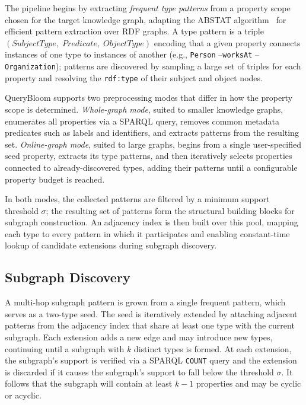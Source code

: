 The pipeline begins by extracting \textit{frequent type patterns} from a
property scope chosen for the target knowledge graph, adapting the ABSTAT
algorithm~\cite{Spahiu2016ABSTATOL} for efficient pattern extraction over RDF
graphs. A type pattern is a triple $(\textit{SubjectType},\;\textit{Predicate},
\;\textit{ObjectType})$ encoding that a given property connects instances of one
type to instances of another (e.g., \texttt{Person} --\texttt{worksAt} --\texttt{Organization}); patterns are discovered by sampling a large set of
triples for each property and resolving the \texttt{rdf:type} of their subject
and object nodes.

QueryBloom supports two preprocessing modes that differ in how the property
scope is determined. \textit{Whole-graph mode}, suited to smaller knowledge
graphs, enumerates all properties via a SPARQL query, removes common metadata
predicates such as labels and identifiers, and extracts patterns from the
resulting set. \textit{Online-graph mode}, suited to large graphs, begins from a
single user-specified seed property, extracts its type patterns, and then
iteratively selects properties connected to already-discovered types, adding
their patterns until a configurable property budget is reached.

In both modes, the collected patterns are filtered by a minimum support
threshold $\sigma$; the resulting set of patterns form the structural building blocks for
subgraph construction. An adjacency index is then built over this pool, mapping
each type to every pattern in which it participates and enabling constant-time
lookup of candidate extensions during subgraph discovery.

\subsection{Subgraph Discovery}

A multi-hop subgraph pattern is grown from a single frequent pattern, which serves as a two-type seed. The seed is iteratively extended by attaching adjacent patterns from the adjacency index that share at least one type with the current subgraph. Each extension adds a new edge and may introduce new types, continuing until a subgraph with $k$ distinct types is formed. At each extension, the subgraph's support is verified via a SPARQL \texttt{COUNT} query and the extension is discarded if it causes the subgraph's support to fall below the threshold $\sigma$. It follows that the subgraph will contain at least $k-1$ properties and may be cyclic or acyclic.

